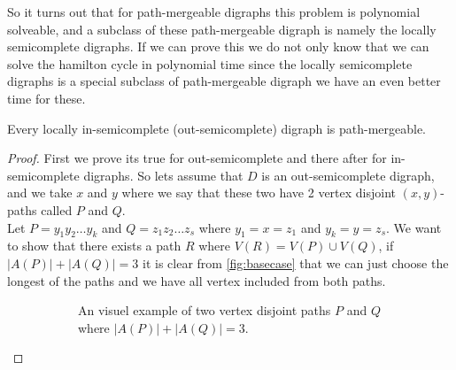 So it turns out that for path-mergeable digraphs this problem is polynomial solveable, and a subclass of these path-mergeable digraph is namely the locally semicomplete digraphs. 
If we can prove this we do not only know that we can solve the hamilton cycle in polynomial time since the locally semicomplete digraphs is a special subclass of path-mergeable digraph we have an even better time for these.
\begin{prop}
    Every locally in-semicomplete (out-semicomplete) digraph is path-mergeable.
\end{prop}
\begin{proof}
    First we prove its true for out-semicomplete and there after for in-semicomplete digraphs.
    So lets assume that $D$ is an out-semicomplete digraph, and we take $x$ and $y$ where we say that these two have 2 vertex disjoint $(x,y)$-paths called $P$ and $Q$.\\
    Let $P=y_1y_2\dots y_k$ and $Q=z_1z_2\dots z_s$ where $y_1=x=z_1$ and $y_k=y=z_s$. We want to show that there exists a path $R$ where $V(R)=V(P)\cup V(Q)$, if $|A(P)|+|A(Q)|=3$ it is clear from \autoref{fig:basecase} that we can just choose the longest of the paths and we have all vertex included from both paths.
    \begin{figure}
        \centering
        \begin{subfigure}{0.36\textwidth}
            \centering
            \caption{An visuel example of two vertex disjoint paths $P$ and $Q$ where $|A(P)|+|A(Q)|=3$.}
            \label{fig:basecase}
        \end{subfigure}\hfill
        \begin{subfigure}{0.60\textwidth}
            \centering
\end{subfigure}
\end{figure}
\end{proof}
